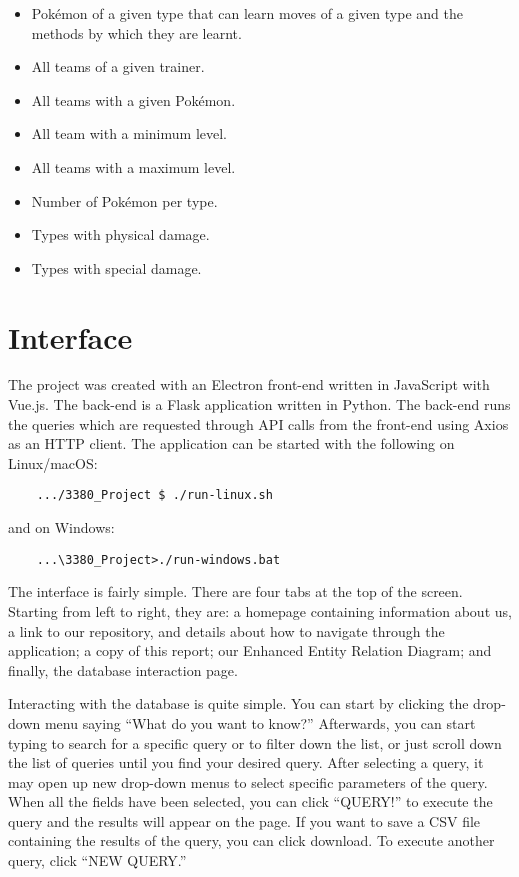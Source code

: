 \documentclass{article}
\begin{document}
\begin{itemize}
    \item Pok\'emon of a given type that can learn moves of a given type and the methods by which
        they are learnt.
    \item All teams of a given trainer.
    \item All teams with a given Pok\'emon.
    \item All team with a minimum level.
    \item All teams with a maximum level.
    \item Number of Pok\'emon per type.
    \item Types with physical damage.
    \item Types with special damage.
\end{itemize}

\section{Interface}
The project was created with an Electron front-end written in JavaScript with Vue.js. The back-end
is a Flask application written in Python. The back-end runs the queries which are requested 
through API calls from the front-end using Axios as an HTTP client. 
The application can be started with the following on Linux/macOS:
\begin{verbatim}
    .../3380_Project $ ./run-linux.sh
\end{verbatim}
and on Windows:
\begin{verbatim}
    ...\3380_Project>./run-windows.bat
\end{verbatim}

The interface is fairly simple. There are four tabs at the top of the screen. Starting from left
to right, they are: a homepage containing information about us, a link to our repository, and
details about how to navigate through the application; a copy of this report; our 
Enhanced Entity Relation Diagram; and finally, the database interaction page.

Interacting with the database is quite simple. You can start by clicking the drop-down menu saying
``What do you want to know?'' Afterwards, you can start typing to search for a specific query or 
to filter down the list, or just scroll down the list of queries until you find your desired 
query. After selecting a query, it may open up new drop-down menus to select specific parameters
of the query. When all the fields have been selected, you can click ``QUERY!'' to execute the 
query and the results will appear on the page. 
If you want to save a CSV file containing the results of the query, you can click download. To 
execute another query, click ``NEW QUERY.''
\end{document}
